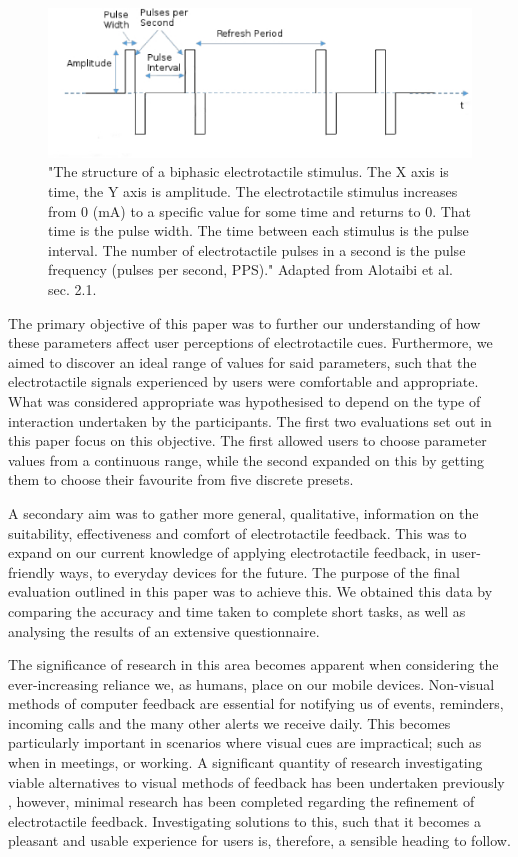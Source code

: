 \documentclass{mpaper}
\begin{document}
\begin{figure}
    \includegraphics[scale=0.4]{images/chi22-46-fig2.jpg}
    \caption{\label{pulse-struc} "The structure of a biphasic electrotactile stimulus. The X axis is time, the Y axis is amplitude. The electrotactile stimulus increases from 0 (mA) to a specific value for some time and returns to 0. That time is the pulse width. The time between each stimulus is the pulse interval. The number of electrotactile pulses in a second is the pulse frequency (pulses per second, PPS)." Adapted from Alotaibi et al. sec. 2.1. \cite{10.1145/3491102.3501863}}
\end{figure}

The primary objective of this paper was to further our understanding of how these parameters affect user perceptions of electrotactile cues. Furthermore, we aimed to discover an ideal range of values for said parameters, such that the electrotactile signals experienced by users were comfortable and appropriate. What was considered appropriate was hypothesised to depend on the type of interaction undertaken by the participants. The first two evaluations set out in this paper focus on this objective. The first allowed users to choose parameter values from a continuous range, while the second expanded on this by getting them to choose their favourite from five discrete presets.

A secondary aim was to gather more general, qualitative, information on the suitability, effectiveness and comfort of electrotactile feedback. This was to expand on our current knowledge of applying electrotactile feedback, in user-friendly ways, to everyday devices for the future. The purpose of the final evaluation outlined in this paper was to achieve this. We obtained this data by comparing the accuracy and time taken to complete short tasks, as well as analysing the results of an extensive questionnaire.

The significance of research in this area becomes apparent when considering the ever-increasing reliance we, as humans, place on our mobile devices. Non-visual methods of computer feedback are essential for notifying us of events, reminders, incoming calls and the many other alerts we receive daily. This becomes particularly important in scenarios where visual cues are impractical; such as when in meetings, or working. A significant quantity of research investigating viable alternatives to visual methods of feedback has been undertaken previously \cite{10.1145/1322192.1322222, vibro_wearables, blind_study}, however, minimal research has been completed regarding the refinement of electrotactile feedback. Investigating solutions to this, such that it becomes a pleasant and usable experience for users is, therefore, a sensible heading to follow. 
\end{document}
